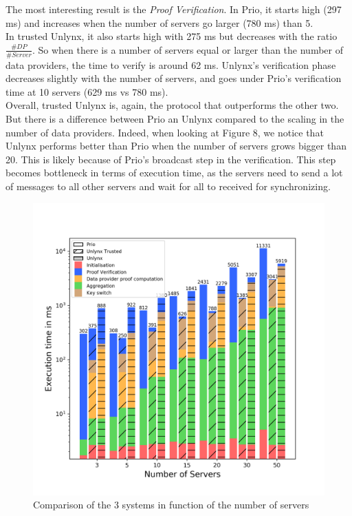 \documentclass{article}
\begin{document}
The most interesting result is the \textit{Proof Verification}. In Prio, it starts high (297 ms) and increases when the number of servers go larger (780 ms) than 5.\\
In trusted Unlynx, it also starts high with 275 ms but decreases with the ratio $\frac{\#DP}{\#Server}$. So when there is a number of servers equal or larger than the number of data providers, the time to verify is around 62 ms. Unlynx's verification phase decreases slightly with the number of servers, and goes under Prio's verification time at 10 servers (629 ms vs 780 ms).\\

Overall, trusted Unlynx is, again, the protocol that outperforms the other two. But there is a difference between Prio an Unlynx compared to the scaling in the number of data providers. Indeed, when looking at Figure 8, we notice that Unlynx performs better than Prio when the number of servers grows bigger than 20. This is likely because of Prio's broadcast step in the verification.
This step becomes bottleneck in terms of execution time, as the servers need to send a lot of messages to all other servers and wait for all to received for synchronizing.
\begin{figure}[H]
\centering
\includegraphics[scale=0.7]{img/ComparisonServer.png}
\caption{Comparison of the 3 systems in function of the number of servers}
\end{figure}
\end{document}
